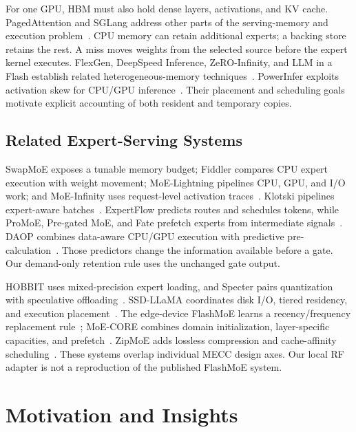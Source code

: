 \documentclass[conference,9pt,letterpaper]{IEEEtran}
\begin{document}
For one GPU, HBM must also hold dense layers, activations, and KV cache. PagedAttention and SGLang address other parts of the serving-memory and execution problem~\cite{pagedattention,sglang}. CPU memory can retain additional experts; a backing store retains the rest. A miss moves weights from the selected source before the expert kernel executes. FlexGen, DeepSpeed Inference, ZeRO-Infinity, and LLM in a Flash establish related heterogeneous-memory techniques~\cite{flexgen,dsinference,zeroinfinity,llmflash}. PowerInfer exploits activation skew for CPU/GPU inference~\cite{powerinfer}. Their placement and scheduling goals motivate explicit accounting of both resident and temporary copies.

\subsection{Related Expert-Serving Systems}
SwapMoE exposes a tunable memory budget; Fiddler compares CPU expert execution with weight movement; MoE-Lightning pipelines CPU, GPU, and I/O work; and MoE-Infinity uses request-level activation traces~\cite{swapmoe,fiddler,lightning,moeinfinity}. Klotski pipelines expert-aware batches~\cite{klotski}. ExpertFlow predicts routes and schedules tokens, while ProMoE, Pre-gated MoE, and Fate prefetch experts from intermediate signals~\cite{expertflow,promoe,pregated,fate}. DAOP combines data-aware CPU/GPU execution with predictive pre-calculation~\cite{daop}. Those predictors change the information available before a gate. Our demand-only retention rule uses the unchanged gate output.

HOBBIT uses mixed-precision expert loading, and Specter pairs quantization with speculative offloading~\cite{hobbit,specter}. SSD-LLaMA coordinates disk I/O, tiered residency, and execution placement~\cite{ssdllama}. The edge-device FlashMoE learns a recency/frequency replacement rule~\cite{flashmoe}; MoE-CORE combines domain initialization, layer-specific capacities, and prefetch~\cite{core}. ZipMoE adds lossless compression and cache-affinity scheduling~\cite{zipmoe}. These systems overlap individual MECC design axes. Our local RF adapter is not a reproduction of the published FlashMoE system.

\section{Motivation and Insights}
\label{sec:challenges}
\end{document}
